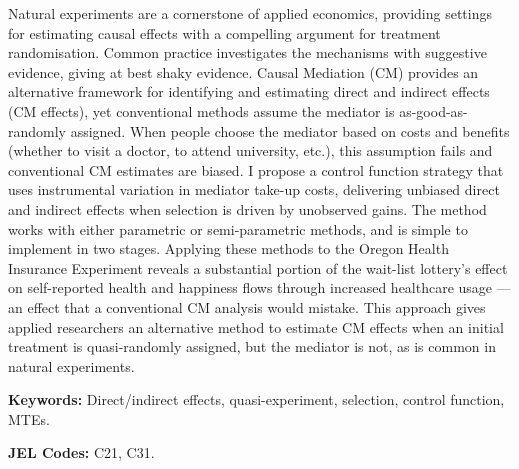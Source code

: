 \noindent
Natural experiments are a cornerstone of applied economics, providing settings for estimating causal effects with a compelling argument for treatment randomisation.
Common practice investigates the mechanisms with suggestive evidence, giving at best shaky evidence.
Causal Mediation (CM) provides an alternative framework for identifying and estimating direct and indirect effects (CM effects), yet conventional methods assume the mediator is as-good-as-randomly assigned.
When people choose the mediator based on costs and benefits (whether to visit a doctor, to attend university, etc.), this assumption fails and conventional CM estimates are biased.
I propose a control function strategy that uses instrumental variation in mediator take-up costs, delivering unbiased direct and indirect effects when selection is driven by unobserved gains.
The method works with either parametric or semi-parametric methods, and is simple to implement in two stages.
Applying these methods to the Oregon Health Insurance Experiment reveals a substantial portion of the wait-list lottery's effect on self-reported health and happiness flows through increased healthcare usage --- an effect that a conventional CM analysis would mistake.
This approach gives applied researchers an alternative method to estimate CM effects when an initial treatment is quasi-randomly assigned, but the mediator is not, as is common in natural experiments.

\vspace{0.5cm}
\noindent
\textbf{Keywords:}
Direct/indirect effects, quasi-experiment, selection, control function, MTEs.

\vspace{0.1cm}
\noindent
\textbf{JEL Codes:}
C21, C31.
